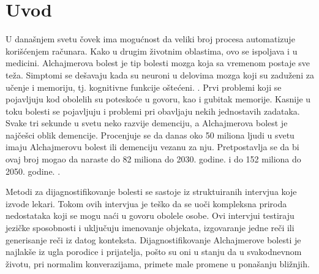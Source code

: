 \documentclass[12pt,oneside]{memoir}
\begin{document}
\frontmatter
\naslovna
\komisija
\tableofcontents*

\mainmatter


\chapter{Uvod}

U današnjem svetu čovek ima mogućnost da veliki broj procesa automatizuje korišćenjem računara.  Kako u drugim životnim oblastima,  ovo se ispoljava i u medicini.  Alchajmerova bolest je tip bolesti mozga koja sa vremenom postaje sve teža.  Simptomi se dešavaju kada su neuroni u delovima mozga koji su zaduženi za učenje i memoriju, tj. kognitivne funkcije oštećeni. \cite{Alzheimer_facts_figures}.  Prvi problemi koji se pojavljuju kod obolelih su poteskoće u govoru, kao i gubitak memorije.  Kasnije u toku bolesti se pojavljuju i problemi pri obavljaju nekih jednostavih zadataka.  Svake tri sekunde u svetu neko razvije demenciju, a Alchajmerova bolest je najčešci oblik demencije.  Procenjuje se da danas oko 50 miliona ljudi u svetu imaju Alchajmerovu bolest ili demenciju vezanu za nju.  Pretpostavlja se da bi ovaj broj mogao da naraste do 82 miliona do 2030.  godine. i do 152 miliona do 2050. godine.  \cite{Language_impairment}.  

Metodi za dijagnostifikovanje bolesti se sastoje iz struktuiranih intervjua koje izvode lekari.  Tokom ovih intervjua je teško da se  uoči kompleksna priroda nedostataka koji se mogu naći u govoru obolele osobe.  Ovi intervjui testiraju jezičke sposobnosti i uključuju imenovanje objekata,  izgovaranje jedne reči ili generisanje reči iz datog konteksta\cite{automatic_det_and_rat}.  Dijagnostifikovanje Alchajmerove bolesti je najlakše iz ugla porodice i prijatelja,  pošto su oni u stanju da u svakodnevnom životu,  pri normalim konverazijama,  primete male promene u ponašanju bližnjih. 
\end{document}
